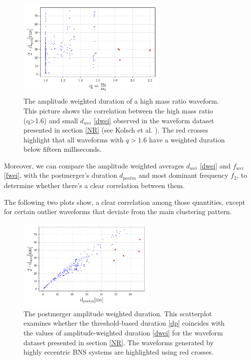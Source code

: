 \begin{figure}[hbt!]
\begin{center}
\includegraphics[width=0.65\textwidth, angle=0]{images/Data_analysis/results/Mr.pdf}
\captionsetup{width=0.8\textwidth}
\caption[The amplitude weighted duration of a high mass ratio waveform]{The amplitude weighted duration of a high mass ratio waveform. This picture shows the correlation between the high mass ratio (q>1.6) and small $d_{wei}$ \ref{dwei} observed in the waveform dataset presented in section \ref{NR} (see Kolsch et al. \cite{Kolsch:2021lub}). The red crosses highlight that all waveforms with $q>1.6$ have a weighted duration below fifteen milliseconds.}
\label{High mass ratio}
\end{center}
\end{figure}
\FloatBarrier


Moreover, we can compare the amplitude weighted averages $d_{wei}$ \ref{dwei} and $f_{wei}$ \ref{fwei}, with the postmerger's duration $d_{postm}$ and most dominant frequency $f_2$, to determine whether there's a clear correlation between them.

The following two plots show, a clear correlation among those quantities, except for certain outlier waveforms that deviate from the main clustering pattern. 

\begin{figure}[hbt!]
\begin{center}
\includegraphics[width=0.6\textwidth, angle=0]{images/Data_analysis/results/res1.pdf}
\captionsetup{width=0.8\textwidth}
\caption[The postmerger amplitude weighted duration]{The postmerger amplitude weighted duration. This scatterplot examines whether the threshold-based duration \ref{dp} coincides with the values of amplitude-weighted duration \ref{dwei} for the waveform dataset presented in section \ref{NR}. The waveforms generated by highly eccentric BNS systems are highlighted using red crosses.}
\label{duration measure}
\end{center}
\end{figure}

